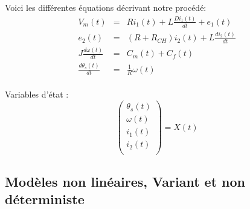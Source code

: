 \hspace{5mm} \textbullet \hspace{5mm} Voici les différentes équations décrivant notre procédé:
\begin{eqnarray}
V_m(t)  					&=& 	R i_1(t) + L \frac{D i_1(t)}{d t} + e_1(t) \\
e_2(t) 						&=& 	(R+R_{CH}) i_2(t) + L \frac{d i_2(t)}{d t} \\
J \frac{d \omega(t)}{dt} 	&=&		C_m(t) + C_f(t)		\\
 \frac{d \theta_s(t)}{dt} 	&=&		\frac{1}{R}\omega(t) \\
\end{eqnarray}

\hspace{5mm} \textbullet \hspace{5mm} Variables d'état :
\begin{equation}
\begin{pmatrix}
\theta_s(t)\\
\omega(t)\\
i_1(t)\\
i_2(t)\\
\end{pmatrix}
=
X(t)
\end{equation}
\subsection{Modèles non linéaires, Variant et non déterministe}
